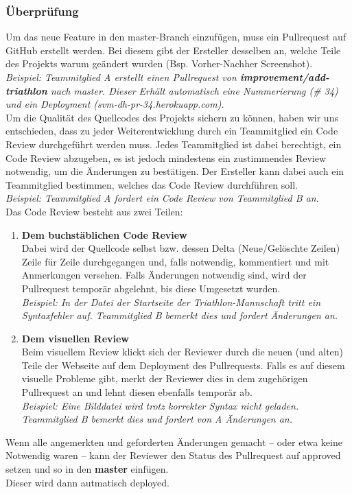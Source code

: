 \documentclass[12pt,a4paper]{article}
\begin{document}
\subsubsection{Überprüfung}
Um das neue Feature in den master-Branch einzufügen, muss ein Pullrequest auf GitHub erstellt werden. Bei diesem gibt der Ersteller desselben an, welche Teile des Projekts warum geändert wurden (Bsp. Vorher-Nachher Screenshot). \\
\emph{Beispiel: Teammitglied A erstellt einen Pullrequest von \textbf{improvement/add-triathlon} nach master. Dieser Erhält automatisch eine Nummerierung (\# 34) und ein Deployment (svm-dh-pr-34.herokuapp.com).}\\
Um die Qualität des Quellcodes des Projekts sichern zu können, haben wir uns entschieden, dass zu jeder Weiterentwicklung durch ein Teammitglied ein Code Review durchgeführt werden muss. Jedes Teammitglied ist dabei berechtigt, ein Code Review abzugeben, es ist jedoch mindestens ein zustimmendes Review notwendig, um die Änderungen zu bestätigen. Der Ersteller kann dabei auch ein Teammitglied bestimmen, welches das Code Review durchführen soll.\\
\emph{Beispiel: Teammitglied A fordert ein Code Review von Teammitglied B an.}\\
Das Code Review besteht aus zwei Teilen:
\begin{enumerate}
\item{\textbf{Dem buchstäblichen Code Review}\\Dabei wird der Quellcode selbst bzw. dessen Delta (Neue/Gelöschte Zeilen) Zeile für Zeile durchgegangen und, falls notwendig, kommentiert und mit Anmerkungen versehen. Falls Änderungen notwendig sind, wird der Pullrequest temporär abgelehnt, bis diese Umgesetzt wurden.\\
\emph{Beispiel: In der Datei der Startseite der Triathlon-Mannschaft tritt ein Syntaxfehler auf. Teammitglied B bemerkt dies und fordert Änderungen an.}}
\item{\textbf{Dem visuellen Review}\\Beim visuellem Review klickt sich der Reviewer durch die neuen (und alten) Teile der Webseite auf dem Deployment des Pullrequests. Falls es auf diesem visuelle Probleme gibt, merkt der Reviewer dies in dem zugehörigen Pullrequest an und lehnt diesen ebenfalls temporär ab.\\
\emph{Beispiel: Eine Bilddatei wird trotz korrekter Syntax nicht geladen. Teammitglied B bemerkt dies und fordert von A Änderungen an.}}
\end{enumerate}
Wenn alle angemerkten und geforderten Änderungen gemacht – oder etwa keine Notwendig waren – kann der Reviewer den Status des Pullrequest auf approved setzen und so in den \textbf{master} einfügen.\\
Dieser wird dann autmatisch deployed.
\end{document}
